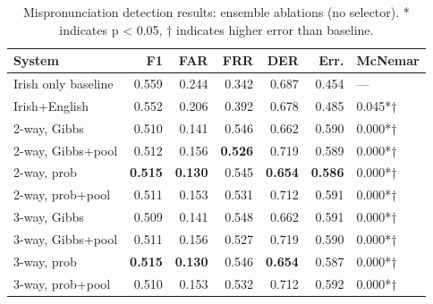 \documentclass[thesis]{cluu}
\begin{document}
\begin{table}[h]
\centering
\caption{Mispronunciation detection results: ensemble ablations (no selector). * indicates p < 0.05, † indicates higher error than baseline.}
\label{tab:results_ensemble_no_selector}
\begin{tabular}{lrrrrrl}
\toprule
System & F1 & FAR & FRR & DER & Err. & McNemar \\
\midrule
Irish only baseline & 0.559 & 0.244 & 0.342 & 0.687 & 0.454 & — \\
Irish+English & 0.552 & 0.206 & 0.392 & 0.678 & 0.485 & 0.045*† \\
\midrule
2-way, Gibbs & 0.510 & 0.141 & 0.546 & 0.662 & 0.590 & 0.000*† \\
2-way, Gibbs+pool & 0.512 & 0.156 & \textbf{0.526} & 0.719 & 0.589 & 0.000*† \\
2-way, prob & \textbf{0.515} & \textbf{0.130} & 0.545 & \textbf{0.654} & \textbf{0.586} & 0.000*† \\
2-way, prob+pool & 0.511 & 0.153 & 0.531 & 0.712 & 0.591 & 0.000*† \\
3-way, Gibbs & 0.509 & 0.141 & 0.548 & 0.662 & 0.591 & 0.000*† \\
3-way, Gibbs+pool & 0.511 & 0.156 & 0.527 & 0.719 & 0.590 & 0.000*† \\
3-way, prob & \textbf{0.515} & \textbf{0.130} & 0.546 & \textbf{0.654} & 0.587 & 0.000*† \\
3-way, prob+pool & 0.510 & 0.153 & 0.532 & 0.712 & 0.592 & 0.000*† \\
\bottomrule
\end{tabular}
\end{table}
\end{document}
